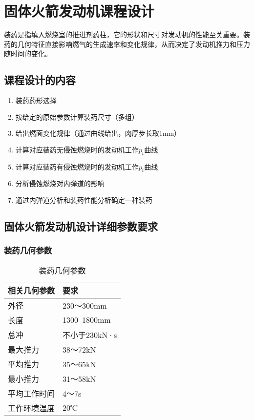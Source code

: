 
\chapter{固体火箭发动机课程设计}

装药是指填入燃烧室的推进剂药柱，它的形状和尺寸对发动机的性能至关重要。装药的几何特征直接影响燃气的生成速率和变化规律，从而决定了发动机推力和压力随时间的变化。

\section{课程设计的内容}

\begin{enumerate}[leftmargin=2em]
    \item 装药药形选择
    \item 按给定的原始参数计算装药尺寸（多组）
    \item 给出燃面变化规律（通过曲线给出，肉厚步长取1mm）
    \item 计算对应装药无侵蚀燃烧时的发动机工作$p_{t}$曲线
    \item 计算对应装药有侵蚀燃烧时的发动机工作$p_{t}$曲线
    \item 分析侵蚀燃烧对内弹道的影响
    \item 通过内弹道分析和装药性能分析确定一种装药
\end{enumerate}
\section{固体火箭发动机设计详细参数要求}

\subsection{装药几何参数}

\begin{table}
  \centering
  \caption{装药几何参数}
  \begin{tabular}{ll}
    \toprule
    相关几何参数          & 要求                         \\
    \midrule
    外径   & 230～300mm \\
    长度   & 1300~1800mm                     \\
    总冲   & 不小于230kN·s    \\
    最大推力   & 38～72kN    \\
    平均推力   & 35～65kN    \\
    最小推力   & 31～58kN    \\
    平均工作时间   & 4～7s    \\
    工作环境温度   & 20℃    \\

    \bottomrule
  \end{tabular}
  \label{tab:three-line}
\end{table}

